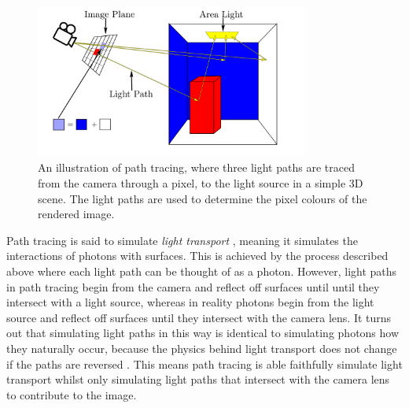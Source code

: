 \documentclass[../dissertation.tex]{subfiles}
\begin{document}
\begin{figure}[h!]
\begin{center}
\includegraphics[width=0.8\textwidth]{images/path_tracing.png}    
\end{center}
\caption{An illustration of path tracing, where three light paths are traced from the camera through a pixel, to the light source in a simple 3D scene. The light paths are used to determine the pixel colours of the rendered image.}
\label{fig:path_tracing_overview}
\end{figure}

Path tracing is said to simulate \textit{light transport} \cite{keller2016path}, meaning it simulates the interactions of photons with surfaces. This is achieved by the process described above where each light path can be thought of as a photon. However, light paths in path tracing begin from the camera and reflect off surfaces until until they intersect with a light source, whereas in reality photons begin from the light source and reflect off surfaces until they intersect with the camera lens. It turns out that simulating light paths in this way is identical to simulating photons how they naturally occur, because the physics behind light transport does not change if the paths are reversed \cite{stanford_graphics}. This means path tracing is able faithfully simulate light transport whilst only simulating light paths that intersect with the camera lens to contribute to the image.
\end{document}
